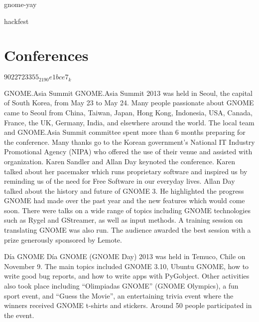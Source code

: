 \documentclass{scrreprt}
\begin{document}
gnome-yay



hackfest




\section{Conferences}

$9022723355_2190e1bce7_k$


GNOME.Asia Summit
GNOME.Asia Summit 2013 was held in Seoul, the capital of South Korea, from May 23 to May 24. Many people passionate about GNOME came to Seoul from China, Taiwan, Japan, Hong Kong, Indonesia, USA, Canada, France, the UK, Germany, India, and elsewhere around the world.
The local team and GNOME.Asia Summit committee spent more than 6 months preparing for the conference. Many thanks go to the Korean government's National IT Industry Promotional Agency (NIPA) who offered the use of their venue and assisted with organization.
Karen Sandler and Allan Day keynoted the conference. Karen talked about her pacemaker which runs proprietary software and inspired us by reminding us of the need for Free Software in our everyday lives. Allan Day talked about the history and future of GNOME 3. He highlighted the progress GNOME had made over the past year and the new features which would come soon.
There were talks on a wide range of topics including GNOME technologies such as Rygel and GStreamer, as well as input methods. A training session on translating GNOME was also run. The audience awarded the best session with a prize generously sponsored by Lemote.

Día GNOME
Día GNOME (GNOME Day) 2013 was held in Temuco, Chile on November 9. The main topics included GNOME 3.10, Ubuntu GNOME, how to write good bug reports, and how to write apps with PyGobject. Other activities also took place including “Olimpiadas GNOME” (GNOME Olympics), a fun sport event, and “Guess the Movie”, an entertaining trivia event where the winners received GNOME t-shirts and stickers. Around 50 people participated in the event. 
\end{document}
